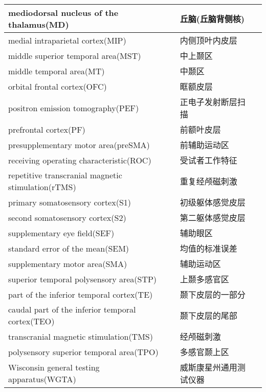 \begin{table}[htbp]
{\begin{tabular}{llll}
        \midrule
        mediodorsal nucleus of the thalamus(MD)      &&丘脑(丘脑背侧核)   \\
        \midrule
        medial intraparietal cortex(MIP)      &&内侧顶叶内皮层   \\
        \midrule
        middle superior temporal area(MST)     &&中上颞区   \\
        \midrule
        middle temporal area(MT)       &&中颞区   \\
        \midrule
        orbital frontal cortex(OFC)       &&眶额皮层   \\
        \midrule
        positron emission tomography(PEF)       &&正电子发射断层扫描   \\
        \midrule
        prefrontal cortex(PF)       &&前额叶皮层   \\
        \midrule
        presupplementary motor area(preSMA)       &&前辅助运动区   \\
        \midrule
        receiving operating characteristic(ROC)       &&受试者工作特征   \\
        \midrule
        repetitive transcranial magnetic stimulation(rTMS)      &&重复经颅磁刺激   \\
        \midrule
        primary somatosensory cortex(S1)      &&初级躯体感觉皮层   \\
        \midrule
        second somatosensory cortex(S2)      &&第二躯体感觉皮层   \\
        \midrule
        supplementary eye field(SEF)      &&辅助眼区   \\
        \midrule
        standard error of the mean(SEM)      &&均值的标准误差   \\
        \midrule
        supplementary motor area(SMA)      &&辅助运动区   \\
        \midrule
        superior temporal polysensory area(STP)      &&上颞多感官区   \\
        \midrule
        part of the inferior temporal cortex(TE)     &&颞下皮层的一部分   \\
        \midrule
        caudal part of the inferior temporal cortex(TEO)      &&颞下皮层的尾部   \\
        \midrule
        transcranial magnetic stimulation(TMS)     &&经颅磁刺激   \\
        \midrule
        polysensory superior temporal area(TPO)      &&多感官颞上区   \\
        \midrule
        Wisconsin general testing apparatus(WGTA)      &&威斯康星州通用测试仪器   \\

		\bottomrule  

	\end{tabular}}
\end{table}%





